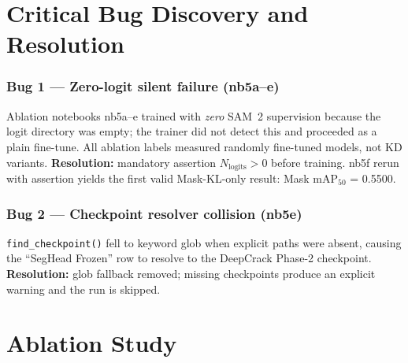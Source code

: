\documentclass[12pt,a4paper]{article}
\begin{document}
\section{Critical Bug Discovery and Resolution}
\label{sec:bugs}

\subsubsection*{Bug 1 --- Zero-logit silent failure (nb5a--e)}

Ablation notebooks nb5a--e trained with \emph{zero} SAM~2 supervision because
the logit directory was empty; the trainer did not detect this and proceeded as
a plain fine-tune.
All ablation labels measured randomly fine-tuned models, not KD variants.
\textbf{Resolution:} mandatory assertion $N_\text{logits}>0$ before training.
nb5f rerun with assertion yields the first valid Mask-KL-only result:
Mask mAP$_{50}$ = 0.5500.

\subsubsection*{Bug 2 --- Checkpoint resolver collision (nb5e)}

\texttt{find\_checkpoint()} fell to keyword glob when explicit paths were
absent, causing the ``SegHead Frozen'' row to resolve to the DeepCrack Phase-2
checkpoint.
\textbf{Resolution:} glob fallback removed; missing checkpoints produce an
explicit warning and the run is skipped.

\section{Ablation Study}
\label{sec:ablation}
\end{document}

